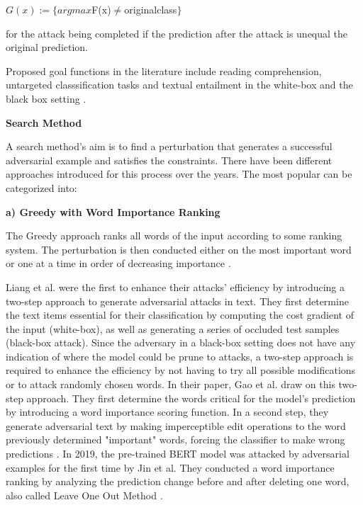 $G(x):= \{argmax$F(x)$ \neq $original\textunderscore class$\}$

for the attack being completed if the prediction after the attack is unequal the original prediction. 

Proposed goal functions in the literature include reading comprehension, untargeted classsification tasks \cite{ebrahimi2017hotflip, alzantot2018generating, li2018textbugger, jin2019bert, garg2020bae} and textual entailment \cite{jin2019bert, alzantot2018generating} in the white-box \cite{papernot2016crafting, liang2017deep, ebrahimi2017hotflip, jin2019bert} and the black box setting \cite{gao2018black, goodman2020fastwordbug}.

\textbf{Search Method}
\label{sec:search_method}

A search method's aim is to find a perturbation that generates a successful adversarial example and satisfies the constraints. There have been different approaches introduced for this process over the years. The most popular can be categorized into:

    \textbf{a) Greedy with Word Importance Ranking}
    
        The Greedy approach ranks all words of the input according to some ranking system. The perturbation is then conducted either on the most important word or one at a time in order of decreasing importance \cite{li2018textbugger, jin2019bert, garg2020bae}.
    
        Liang et al. were the first to enhance their attacks' efficiency by introducing a two-step approach to generate adversarial attacks in text. They first determine the text items essential for their classification by computing the cost gradient of the input (white-box), as well as generating a series of occluded test samples (black-box attack)\cite{liang2017deep}. 
        Since the adversary in a black-box setting does not have any indication of where the model could be prune to attacks, a two-step approach is required to enhance the efficiency by not having to try all possible modifications or to attack randomly chosen words. 
        In their paper, Gao et al. draw on this two-step approach. They first determine the words critical for the model's prediction by introducing a word importance scoring function. In a second step, they generate adversarial text by making imperceptible edit operations to the word previously determined "important" words, forcing the classifier to make wrong predictions \cite{gao2018black}.
        In 2019, the pre-trained BERT model was attacked by adversarial examples for the first time by Jin et al. They conducted a word importance ranking by analyzing the prediction change before and after deleting one word, also called Leave One Out Method \cite{jin2019bert}.  
        
